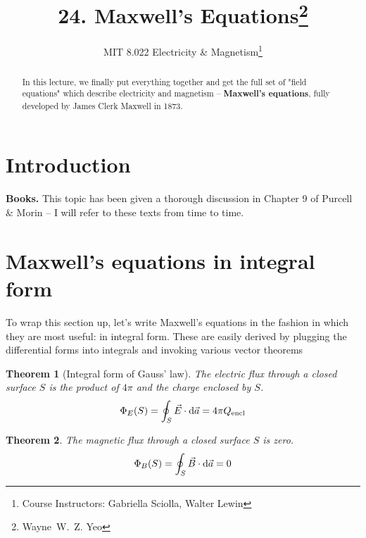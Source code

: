 \documentclass[a4paper]{tufte-handout}
\title{24. Maxwell's Equations\thanks{Wayne~W.~Z. Yeo}}
\author[MIT 8.022]{\textnormal{MIT 8.022} Electricity \& Magnetism\thanks{Course Instructors: Gabriella Sciolla, Walter Lewin}}
\newtheorem{theorem}{Theorem}
\theoremstyle{definition}
\begin{document}
\maketitle%

\begin{abstract}
\noindent
In this lecture, we finally put everything together and get the full set of "field equations" which describe electricity and magnetism -- 
\textbf{Maxwell's equations}, fully developed by James Clerk Maxwell in 1873.

\end{abstract}


\section{Introduction}
\textbf{Books.} This topic has been given a thorough discussion in Chapter 9 of Purcell \& Morin\cite{purcell2013electricity} -- I will refer to these texts from time to time.

\section*{Maxwell's equations in integral form}
To wrap this section up, let's write Maxwell's equations in the fashion in which they are most useful: in integral form. These
are easily derived by plugging the differential forms into integrals and invoking various vector theorems

\begin{theorem}[Integral form of Gauss' law]
  The electric flux through a closed surface $S$ is the product of $4\pi$ and the charge enclosed by $S$.
  \begin{equation}
    \Phi_E (S) = \oint_S \vec{E} \cdot \differential \vec{a} = 4 \pi Q_{\mathrm{encl}}
  \end{equation}
\end{theorem}

\begin{theorem}
  The magnetic flux through a closed surface $S$ is zero.
  \begin{equation}
    \Phi_B (S) = \oint_S \vec{B} \cdot \differential \vec{a} = 0
  \end{equation}
\end{theorem}
\end{document}
